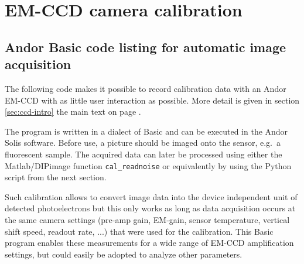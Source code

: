 \chapter{EM-CCD camera calibration}
\section{Andor Basic code listing for automatic image acquisition}
\label{sec:basic-acquisition}


The following code makes it possible to record calibration data with
an Andor EM-CCD with as little user interaction as possible. More
detail is given in section \ref{sec:ccd-intro} the main text on page
\pageref{sec:ccd-intro}.

The program is written in a dialect of Basic and can be executed in
the Andor Solis software. Before use, a picture should be imaged onto
the sensor, e.g.\ a fluorescent sample. The acquired data can later be
processed using either the Matlab/DIPimage function
\verb!cal_readnoise! or equivalently by using the Python script from
the next section.

Such calibration allows to convert image data into the device
independent unit of detected photoelectrons but this only works as
long as data acquisition occurs at the same camera settings (pre-amp
gain, EM-gain, sensor temperature, vertical shift speed, readout rate,
...) that were used for the calibration. This Basic program enables
these measurements for a wide range of EM-CCD amplification settings,
but could easily be adopted to analyze other parameters.


